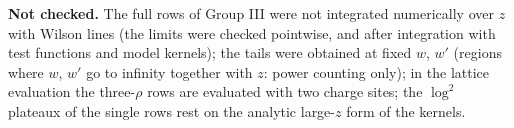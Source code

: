\documentclass[9pt]{article}
\numberwithin{equation}{section}
\begin{document}
\noindent\textbf{Not checked.} The full rows of Group III were not integrated numerically over $z$ with Wilson lines (the limits were checked pointwise, and after integration with test functions and model kernels); the tails were obtained at fixed $w$, $w'$ (regions where $w$, $w'$ go to infinity together with $z$: power counting only); in the lattice evaluation the three-$\rho$ rows are evaluated with two charge sites; the $\log^{2}$ plateaux of the single rows rest on the analytic large-$z$ form of the kernels.
\end{document}
